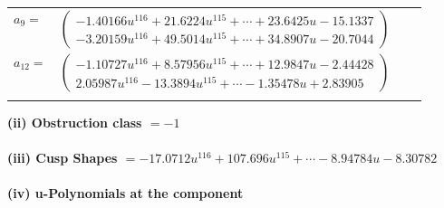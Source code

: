 \documentclass[1p]{elsarticle_modified}
\theoremstyle{definition}
\begin{document}
\begin{tabular}{m{7pt} m{180pt} m{7pt} m{180pt} }
\flushright $a_{9}=$&$\begin{pmatrix}-1.40166 u^{116}+21.6224 u^{115}+\cdots+23.6425 u-15.1337\\-3.20159 u^{116}+49.5014 u^{115}+\cdots+34.8907 u-20.7044\end{pmatrix}$ \\
\flushright $a_{12}=$&$\begin{pmatrix}-1.10727 u^{116}+8.57956 u^{115}+\cdots+12.9847 u-2.44428\\2.05987 u^{116}-13.3894 u^{115}+\cdots-1.35478 u+2.83905\end{pmatrix}$\\&\end{tabular}
\flushleft \textbf{(ii) Obstruction class $= -1$}\\~\\
\flushleft \textbf{(iii) Cusp Shapes $= -17.0712 u^{116}+107.696 u^{115}+\cdots-8.94784 u-8.30782$}\\~\\
\newpage\renewcommand{\arraystretch}{1}
\flushleft \textbf{(iv) u-Polynomials at the component}\newline \\
\end{document}
